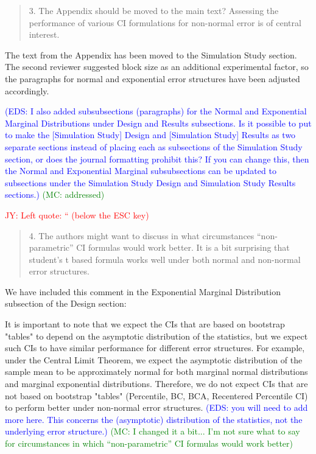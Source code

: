 \documentclass[12pt]{article}
\newcommand{\jy}[1]{\textcolor{red}{JY: #1}}
\newcommand{\eds}[1]{\textcolor{blue}{(EDS: #1)}}
\newcommand{\mc}[1]{\textcolor{green}{(MC: #1)}}
\newenvironment{comment}%
{\begin{quotation}\noindent\small\it\color{darkblue}\ignorespaces%
}{\end{quotation}}
\begin{document}
\begin{comment}
3. The Appendix should be moved to the main text? Assessing the performance of 
various CI formulations for non-normal error is of central interest.
\end{comment} 

The text from the Appendix has been moved to the Simulation Study 
section. The second reviewer suggested block size as an additional experimental
factor, so the paragraphs for normal and exponential error structures have
been adjusted accordingly.

\eds{I also added subsubsections (paragraphs) for the Normal and Exponential 
Marginal Distributions under Design and Results subsections.
Is it possible to put to make the [Simulation Study] Design and 
[Simulation Study] Results as two separate 
sections instead of placing each as subsections of the Simulation Study section,
or does the journal formatting prohibit this?  If you can change this, then the 
Normal and Exponential Marginal subsubsections can be updated to subsections
under the Simulation Study Design and Simulation Study Results sections.}  
\mc{addressed}


\jy{Left quote: `` (below the ESC key)}

\begin{comment}
4. The authors might want to discuss in what circumstances “non-parametric” CI 
formulas would work better. It is a bit surprising that student’s t based 
formula works well under both normal and non-normal error structures.
\end{comment}

We have included this comment in the Exponential Marginal Distribution 
subsection of the Design section:

It is important to note that we expect the CIs that are based on bootstrap 
"tables" to depend on the 
asymptotic distribution of the statistics, but we expect such CIs to 
have similar performance for different error structures. For example, under the 
Central
Limit Theorem, we expect the asymptotic distribution of the sample mean to be 
approximately 
normal for both marginal normal distributions and marginal exponential 
distributions. Therefore, we do not expect CIs that are not based on bootstrap
"tables" (Percentile, BC, BCA, Recentered Percentile CI) to perform better under
non-normal error structures.
\eds{you will need to add more here.  This concerns the
(asymptotic) distribution of the statistics, not the underlying error 
structure.}
\mc{I changed it a bit... I'm not sure what to say for circumstances in which
“non-parametric” CI 
formulas would work better}
\end{document}
